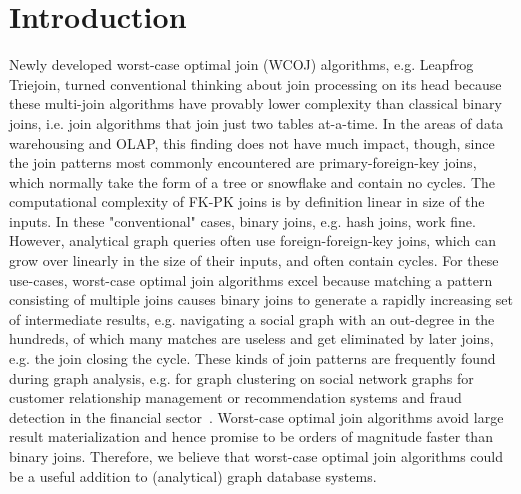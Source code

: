 \section{Introduction} \label{sec:introduction}
Newly developed worst-case optimal join (WCOJ) algorithms, e.g. Leapfrog Triejoin, turned conventional thinking about join processing on its head because these multi-join algorithms have provably lower complexity than classical binary joins, i.e. join algorithms that join just two tables at-a-time.
In the areas of data warehousing and OLAP, this finding does not have much impact, though, since the join patterns most commonly encountered are primary-foreign-key joins, which normally take the form of a tree or snowflake and contain no cycles.
The computational complexity of FK-PK joins is by definition linear in size of the inputs.
In these "conventional" cases, binary joins, e.g. hash joins, work fine.
However, analytical graph queries often use foreign-foreign-key joins, which can grow over linearly in the size of their inputs, and often contain cycles.
For these use-cases, worst-case optimal join algorithms excel because matching a pattern consisting of multiple joins causes binary joins to generate a rapidly increasing set of intermediate results, e.g. navigating a social graph with an out-degree in the hundreds, of which many matches are useless and get eliminated by later joins, e.g. the join closing the cycle. 
These kinds of join patterns are frequently found during graph analysis, e.g. for graph clustering on social network graphs for customer relationship management or recommendation systems and fraud detection in the financial sector~\cite{gcore,gupta2014real}.
Worst-case optimal join algorithms avoid large result materialization and hence promise to be orders of magnitude faster than binary joins.
Therefore, we believe that worst-case optimal join algorithms could be a useful addition to (analytical) graph database systems.

